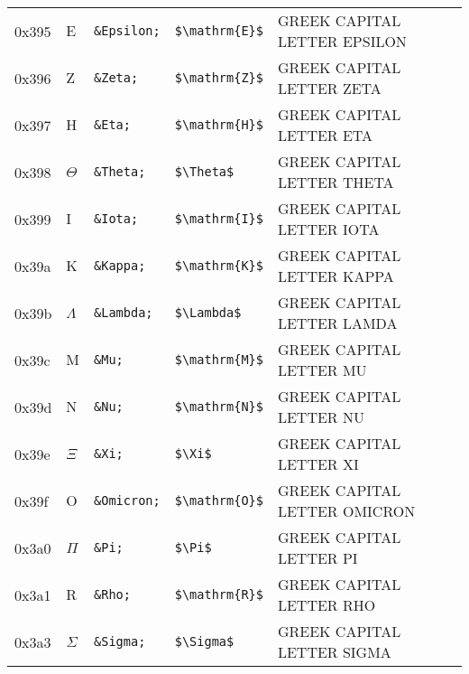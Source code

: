 \documentclass[a4paper,10pt]{article}
\begin{document}
{\begin{center}
\begin{xtabular}{llllp{10cm}}
0x395  & $\mathrm{E}$           & \texttt{\&Epsilon;} & \texttt{\${\textbackslash}mathrm\{E\}\$}               & GREEK CAPITAL LETTER EPSILON               \\
0x396  & $\mathrm{Z}$           & \texttt{\&Zeta;}    & \texttt{\${\textbackslash}mathrm\{Z\}\$}               & GREEK CAPITAL LETTER ZETA                  \\
0x397  & $\mathrm{H}$           & \texttt{\&Eta;}     & \texttt{\${\textbackslash}mathrm\{H\}\$}               & GREEK CAPITAL LETTER ETA                   \\
0x398  & $\Theta$               & \texttt{\&Theta;}   & \texttt{\${\textbackslash}Theta\$}                     & GREEK CAPITAL LETTER THETA                 \\
0x399  & $\mathrm{I}$           & \texttt{\&Iota;}    & \texttt{\${\textbackslash}mathrm\{I\}\$}               & GREEK CAPITAL LETTER IOTA                  \\
0x39a  & $\mathrm{K}$           & \texttt{\&Kappa;}   & \texttt{\${\textbackslash}mathrm\{K\}\$}               & GREEK CAPITAL LETTER KAPPA                 \\
0x39b  & $\Lambda$              & \texttt{\&Lambda;}  & \texttt{\${\textbackslash}Lambda\$}                    & GREEK CAPITAL LETTER LAMDA                 \\
0x39c  & $\mathrm{M}$           & \texttt{\&Mu;}      & \texttt{\${\textbackslash}mathrm\{M\}\$}               & GREEK CAPITAL LETTER MU                    \\
0x39d  & $\mathrm{N}$           & \texttt{\&Nu;}      & \texttt{\${\textbackslash}mathrm\{N\}\$}               & GREEK CAPITAL LETTER NU                    \\
0x39e  & $\Xi$                  & \texttt{\&Xi;}      & \texttt{\${\textbackslash}Xi\$}                        & GREEK CAPITAL LETTER XI                    \\
0x39f  & $\mathrm{O}$           & \texttt{\&Omicron;} & \texttt{\${\textbackslash}mathrm\{O\}\$}               & GREEK CAPITAL LETTER OMICRON               \\
0x3a0  & $\Pi$                  & \texttt{\&Pi;}      & \texttt{\${\textbackslash}Pi\$}                        & GREEK CAPITAL LETTER PI                    \\
0x3a1  & $\mathrm{R}$           & \texttt{\&Rho;}     & \texttt{\${\textbackslash}mathrm\{R\}\$}               & GREEK CAPITAL LETTER RHO                   \\
0x3a3  & $\Sigma$               & \texttt{\&Sigma;}   & \texttt{\${\textbackslash}Sigma\$}                     & GREEK CAPITAL LETTER SIGMA                 \\

\end{xtabular}
\end{center}}
\end{document}

